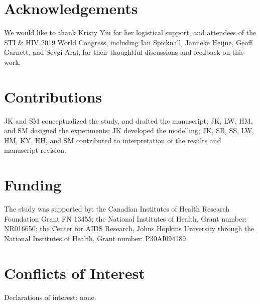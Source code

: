 \section*{Acknowledgements}
We would like to thank Kristy Yiu for her logistical support,
and attendees of the STI \& HIV 2019 World Congress,
including Ian Spicknall, Janneke Heijne, Geoff Garnett, and Sevgi Aral,
for their thoughtful discussions and feedback on this work.
\section*{Contributions}
JK and SM conceptualized the study, and drafted the manuscript;
JK, LW, HM, and SM designed the experiments;
JK developed the modelling;
JK, SB, SS, LW, HM, KY, HH, and SM contributed to
  interpretation of the results and manuscript revision.
\section*{Funding}
The study was supported by:
the Canadian Institutes of Health Research Foundation Grant FN 13455;
the National Institutes of Health, Grant number: NR016650;
the Center for AIDS Research, Johns Hopkins University
  through the National Institutes of Health, Grant number: P30AI094189.
\section*{Conflicts of Interest}
Declarations of interest: none.